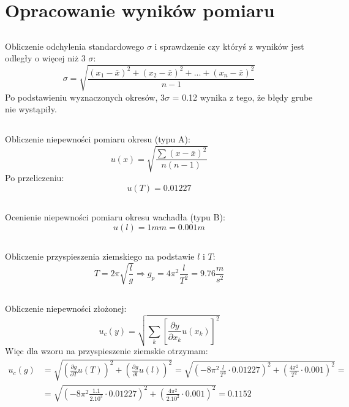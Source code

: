 \documentclass{article}
\begin{document}
\section{Opracowanie wyników pomiaru}
    \subsection{}
    
         Obliczenie odchylenia standardowego $\sigma$ i sprawdzenie czy któryś z wyników jest odległy o więcej niż 3 $\sigma$:
        \[
        \sigma= \sqrt{\frac{(x_{1}-\bar{x})^{2}+(x_{2}-\bar{x})^{2}+...+(x_{n}-\bar{x})^{2}}{n-1}}
        \]
        Po podstawieniu wyznaczonych okresów, $3\sigma$ = 0.12 wynika z tego, że błędy grube nie wystąpiły.
    \subsection{}
        Obliczenie niepewności pomiaru okresu (typu A):
        \[
        u(x) = \sqrt{\frac{\sum(x-\bar{x})^{2}} {n(n-1)}}
        \]
        Po przeliczeniu:
        \[
        u(T) = 0.01227
        \]
    \subsection{}
        Ocenienie niepewności pomiaru okresu wachadła (typu B):
        \[
        u(l) = 1mm = 0.001m 
        \]
    \subsection{}
        Obliczenie przyspieszenia ziemskiego na podstawie $l$ i $T$:
        \[
        T=2\pi\sqrt{\frac{l}{g}} \Rightarrow g_p=4\pi^{2}\frac{l}{T^{2}} = 9.76\frac{m}{s^2}
        \]
    \subsection{}
        Obliczenie niepewności złożonej:
        \[
        u_{c}(y)= \sqrt{\sum_k\left[\frac{\partial{}y}{\partial{}x_{k}}u(x_{k})\right]^2}
        \]
        Więc dla wzoru na przyspieszenie ziemskie otrzymam:
        \begin{equation}
        \begin{split}
        u_{c}(g) &= \sqrt{\left(\frac{\partial{}g}{\partial{}T}u(T)\right)^2 + \left(\frac{\partial{}g}{\partial{}l}u(l)\right)^2} = \sqrt{\left(-8\pi^{2}\frac{l}{T^{3}}\cdot{}0.01227\right)^2 + \left(\frac{4\pi^{2}}{T^{2}}\cdot{}0.001\right)^2} = \\ &=\sqrt{\left(-8\pi^{2}\frac{1.1}{2.10^{3}}\cdot{}0.01227\right)^2 + \left(\frac{4\pi^{2}}{2.10^{2}}\cdot{}0.001\right)^2} = 0.1152
        \end{split}
        \end{equation}
\end{document}
